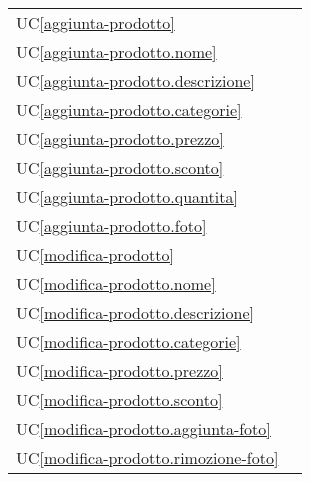 \begin{longtable}{C{6cm} C{6cm}}
    UC\ref{aggiunta-prodotto} &  \\

	UC\ref{aggiunta-prodotto.nome} &  \\

    UC\ref{aggiunta-prodotto.descrizione} &  \\

	UC\ref{aggiunta-prodotto.categorie} &  \\

    UC\ref{aggiunta-prodotto.prezzo} &  \\

	UC\ref{aggiunta-prodotto.sconto} &  \\

    UC\ref{aggiunta-prodotto.quantita} &  \\

	UC\ref{aggiunta-prodotto.foto} &  \\

    UC\ref{modifica-prodotto} &  \\

	UC\ref{modifica-prodotto.nome} &  \\

    UC\ref{modifica-prodotto.descrizione} &  \\

	UC\ref{modifica-prodotto.categorie} &  \\

    UC\ref{modifica-prodotto.prezzo} &  \\

	UC\ref{modifica-prodotto.sconto} &  \\

    UC\ref{modifica-prodotto.aggiunta-foto} &  \\

	UC\ref{modifica-prodotto.rimozione-foto} &  \\


\end{longtable}

